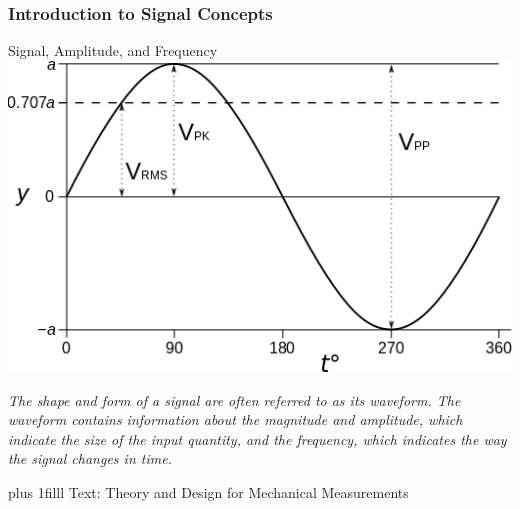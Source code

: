 \documentclass[fleqn]{beamer} %
\newcommand{\sectiontitleI}{Introduction to Signal Concepts}
\newcommand{\btVFill}{\vskip0pt plus 1filll}
\begin{document}
	\begin{frame}[label=sectionI] \small
		\frametitle{\sectiontitleI}
		
		\begin{multicols}{2}
		{\PR Signal}, {\RD Amplitude}, and {\BL Frequency}\vspace{2mm}\\
		\includegraphics[scale=.3]{amplitude_frequency.png} 
		
		{\it The shape and form of a {\PR signal} are often referred to as its {\PN waveform}.
		The {\PN waveform} contains information about the magnitude and {\RD amplitude}, which indicate the size of
		the input quantity, and the {\BL frequency}, which indicates the way the {\PR signal} changes in time. }\vspace{5mm}\\
		\end{multicols}
		\btVFill
		\tiny{Text: Theory and Design for Mechanical Measurements}
	\end{frame}
\end{document}
